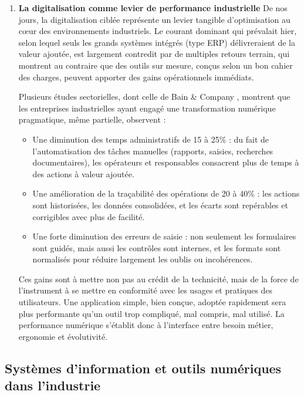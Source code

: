 \documentclass[11pt,a4paper]{article}
\begin{document}
\begin{enumerate}
\item \textbf{La digitalisation comme levier de performance industrielle}
De nos jours, la digitalisation ciblée représente un levier tangible d’optimisation au cœur des environnements industriels. Le courant dominant qui prévalait hier, selon lequel seuls les grands systèmes intégrés (type ERP) délivreraient de la valeur ajoutée, est largement contredit par de multiples retours terrain, qui montrent au contraire que des outils sur mesure, conçus selon un bon cahier des charges, peuvent apporter des gains opérationnels immédiats.

Plusieurs études sectorielles, dont celle de Bain \& Company \cite{bib:bain2019}, montrent que les entreprises industrielles ayant engagé une transformation numérique pragmatique, même partielle, observent :


\begin{itemize}
    \item Une diminution des temps administratifs de 15 à 25\% : du fait de l’automatisation des tâches manuelles (rapports, saisies, recherches documentaires), les opérateurs et responsables consacrent plus de temps à des actions à valeur ajoutée.

\item Une amélioration de la traçabilité des opérations de 20 à 40\% : les actions sont historisées, les données consolidées, et les écarts sont repérables et corrigibles avec plus de facilité.

\item Une forte diminution des erreurs de saisie : non seulement les formulaires sont guidés, mais aussi les contrôles sont internes, et les formats sont normalisés pour réduire largement les oublis ou incohérences.

\end{itemize}

Ces gains sont à mettre non pas au crédit de la technicité, mais de la force de l’instrument à se mettre en conformité avec les usages et pratiques des utilisateurs. Une application simple, bien conçue, adoptée rapidement sera plus performante qu’un outil trop compliqué, mal compris, mal utilisé. La performance numérique s’établit donc à l’interface entre besoin métier, ergonomie et évolutivité.


\end{enumerate}

\subsection{Systèmes d'information et outils numériques dans l’industrie}
\end{document}
